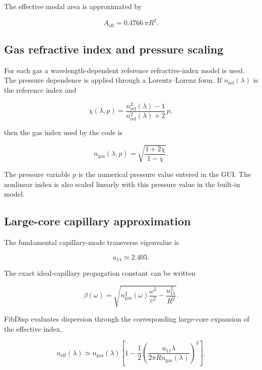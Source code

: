 \documentclass[11pt,a4paper]{article}
\begin{document}
The effective modal area is approximated by

\begin{equation}
\boxed{
A_{\mathrm{eff}}=0.4766\,\pi R^2.
}
\end{equation}

\subsection{Gas refractive index and pressure scaling}

For each gas a wavelength-dependent reference refractive-index model is used.
The pressure dependence is applied through a Lorentz--Lorenz form. If
$n_{\mathrm{ref}}(\lambda)$ is the reference index and

\begin{equation}
\chi(\lambda,p)
=
\frac{n_{\mathrm{ref}}^2(\lambda)-1}
     {n_{\mathrm{ref}}^2(\lambda)+2}\,p,
\end{equation}

then the gas index used by the code is

\begin{equation}
\boxed{
n_{\mathrm{gas}}(\lambda,p)
=
\sqrt{\frac{1+2\chi}{1-\chi}}.
}
\end{equation}

The pressure variable $p$ is the numerical pressure value entered in the GUI.
The nonlinear index is also scaled linearly with this pressure value in the
built-in model.

\subsection{Large-core capillary approximation}

The fundamental capillary-mode transverse eigenvalue is

\begin{equation}
 u_{11}\simeq2.405.
\end{equation}

The exact ideal-capillary propagation constant can be written

\begin{equation}
\beta(\omega)
=
\sqrt{
 n_{\mathrm{gas}}^2(\omega)\frac{\omega^2}{c^2}
 -\frac{u_{11}^2}{R^2}
}.
\end{equation}

FibDisp evaluates dispersion through the corresponding large-core expansion of
the effective index,

\begin{equation}
\boxed{
n_{\mathrm{eff}}(\lambda)
\simeq
n_{\mathrm{gas}}(\lambda)
\left[
1-
\frac{1}{2}
\left(
\frac{u_{11}\lambda}
{2\pi R n_{\mathrm{gas}}(\lambda)}
\right)^2
\right].
}
\end{equation}
\end{document}
